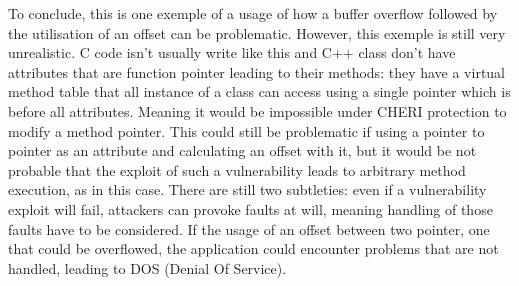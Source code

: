 \documentclass[a4paper, 11pt]{article}
\begin{document}
\begin{center}
\end{center}

To conclude, this is one exemple of a usage of how a buffer overflow followed by the utilisation of an offset can be problematic.
However, this exemple is still very unrealistic. C code isn't usually write like this and C++ class don't have attributes that are function pointer leading to their methods: they have a virtual method table that all instance of a class can access using a single pointer which is before all attributes. Meaning it would be impossible under CHERI protection to modify a method pointer. This could still be problematic if using a pointer to pointer as an attribute and calculating an offset with it, but it would be not probable that the exploit of such a vulnerability leads to arbitrary method execution, as in this case.
There are still two subtleties: even if a vulnerability exploit will fail, attackers can provoke faults at will, meaning handling of those faults have to be considered. If the usage of an offset between two pointer, one that could be overflowed, the application could encounter problems that are not handled, leading to DOS (Denial Of Service).
\end{document}
